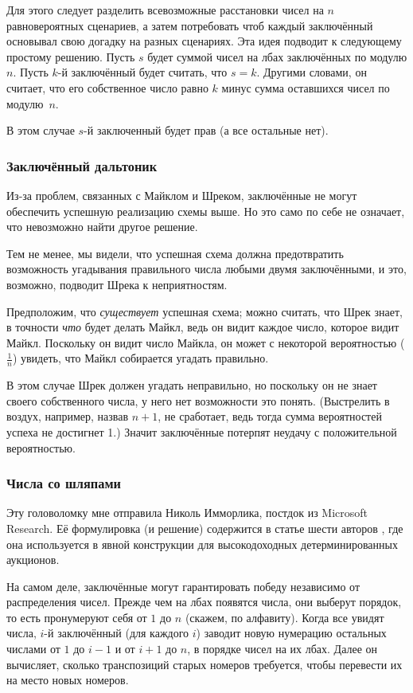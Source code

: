 Для этого следует разделить всевозможные расстановки чисел на $n$ равновероятных сценариев, а затем потребовать чтоб каждый заключённый основывал свою догадку на разных сценариях.
Эта идея подводит к следующему простому решению.
Пусть $s$ будет суммой чисел на лбах заключённых по модулю $n$.
Пусть $k$-й заключённый будет считать, что $s = k$.
Другими словами, он считает, что его собственное число равно $k$ минус сумма оставшихся чисел по модулю~$n$.

В этом случае $s$-й заключенный будет прав (а все остальные нет).

\subsubsection*{Заключённый дальтоник}

Из-за проблем, связанных с Майклом и Шреком, заключённые не могут обеспечить успешную реализацию схемы выше.
Но это само по себе не означает, что невозможно найти другое решение.

Тем не менее, мы видели, что успешная схема должна предотвратить возможность угадывания правильного числа любыми двумя заключёнными, и это, возможно, подводит Шрека к неприятностям.

Предположим, что \emph{существует} успешная схема; можно считать, что Шрек знает, в точности \emph{что} будет делать Майкл,
ведь он видит каждое число, которое видит Майкл.
Поскольку он видит число Майкла, он может с некоторой вероятностью ($\tfrac1n$) увидеть, что Майкл собирается угадать правильно.

В этом случае Шрек должен угадать неправильно, но поскольку он не знает своего собственного числа, у него нет возможности это понять.
(Выстрелить в воздух, например, назвав $n + 1$, не сработает, ведь тогда сумма вероятностей успеха не достигнет 1.)
Значит заключённые потерпят неудачу с положительной вероятностью.

\subsubsection*{Числа со шляпами}

Эту головоломку мне отправила Николь Имморлика, постдок из Microsoft Research.
Её формулировка (и решение) содержится в статье шести авторов \cite{1}, где она используется в явной конструкции для высокодоходных детерминированных аукционов.

На самом деле, заключённые могут гарантировать победу независимо от распределения чисел.
Прежде чем на лбах появятся числа, они выберут порядок, то есть пронумеруют себя от $1$ до $n$ (скажем, по алфавиту).
Когда все увидят числа, $i$-й заключённый (для каждого $i$) заводит новую нумерацию остальных числами от $1$ до $i - 1$ и от $i + 1$ до $n$, в порядке чисел на их лбах.
Далее он вычисляет, сколько транспозиций старых номеров требуется, чтобы перевести их на место новых номеров.

